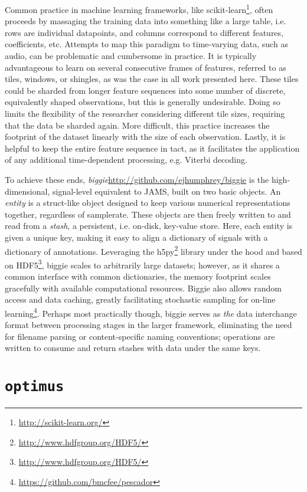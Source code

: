 Common practice in machine learning frameworks, like scikit-learn\footnote{\url{http://scikit-learn.org/}}, often proceeds by massaging the training data into something like a large table, i.e. rows are individual datapoints, and columns correspond to different features, coefficients, etc.
Attempts to map this paradigm to time-varying data, such as audio, can be problematic and cumbersome in practice.
It is typically advantageous to learn on several consecutive frames of features, referred to as tiles, windows, or shingles, as was the case in all work presented here.
These tiles could be sharded from longer feature sequences into some number of discrete, equivalently shaped observations, but this is generally undesirable.
Doing so limits the flexibility of the researcher considering different tile sizes, requiring that the data be sharded again.
More difficult, this practice increases the footprint of the dataset linearly with the size of each observation.
Lastly, it is helpful to keep the entire feature sequence in tact, as it facilitates the application of any additional time-dependent processing, e.g. Viterbi decoding.

To achieve these ends, \emph{biggie}\url{http://github.com/ejhumphrey/biggie} is the high-dimensional, signal-level equivalent to JAMS, built on two basic objects.
An \emph{entity} is a struct-like object designed to keep various numerical representations together, regardless of samplerate.
These objects are then freely written to and read from a \emph{stash}, a persistent, i.e. on-disk, key-value store.
Here, each entity is given a unique key, making it easy to align a dictionary of signals with a dictionary of annotations.
Leveraging the h5py\footnote{\url{http://www.hdfgroup.org/HDF5/}} library under the hood and based on HDF5\footnote{\url{http://www.hdfgroup.org/HDF5/}}, biggie scales to arbitrarily large datasets;
however, as it shares a common interface with common dictionaries, the memory footprint scales gracefully with available computational resources.
Biggie also allows random access and data caching, greatly facilitating stochastic sampling for on-line learning\footnote{\url{https://github.com/bmcfee/pescador}}.
Perhaps most practically though, biggie serves as \emph{the} data interchange format between processing stages in the larger framework, eliminating the need for filename parsing or content-specific naming conventions; operations are written to consume and return stashes with data under the same keys.


\section{\texttt{optimus}}
\label{sec:optimus}

